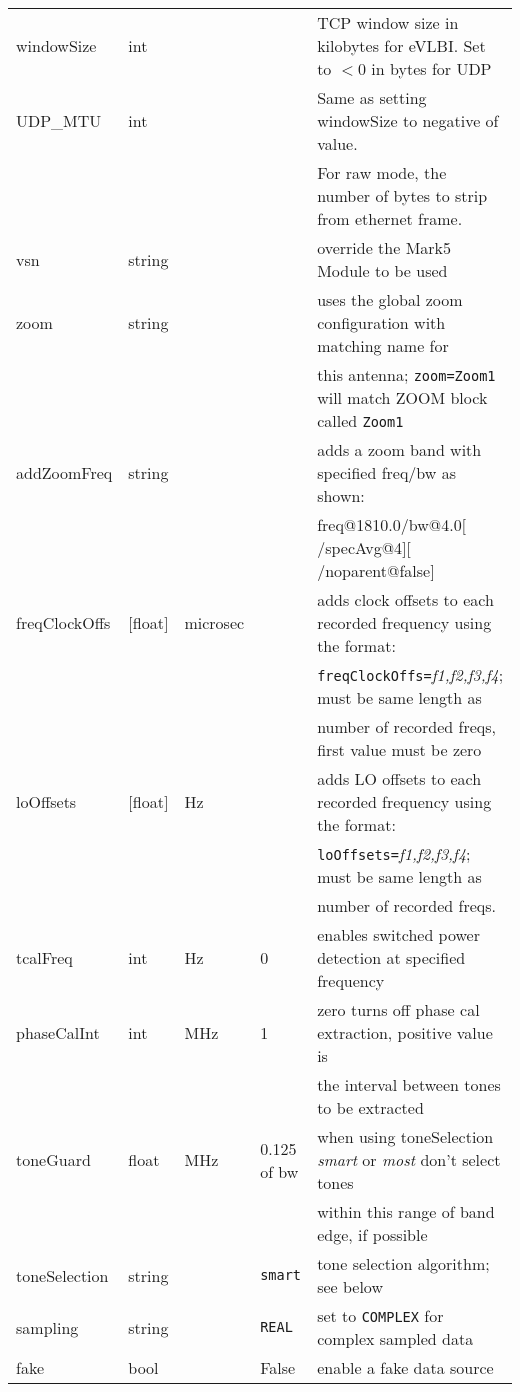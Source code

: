 \begin{center}
\begin{tabular}{l l l l l}
windowSize	& int		&		&		& TCP window size in kilobytes for eVLBI. Set to $<0$ in bytes for UDP \\
UDP\_MTU	& int		&		&		& Same as setting windowSize to negative of value. \\
		&		&		&		& For raw mode, the number of bytes to strip from ethernet frame. \\
vsn		& string	&		&		& override the Mark5 Module to be used \\
zoom 		& string	&		&		& uses the global zoom configuration with matching name for \\
		&		&		&		& this antenna; {\tt zoom=Zoom1} will match ZOOM block called {\tt Zoom1} \\
addZoomFreq	& string	&		&		& adds a zoom band with specified freq/bw as shown: \\
		&		&		&		& freq@1810.0/bw@4.0$[$/specAvg@4$][$/noparent@false$]$ \\
freqClockOffs	& $[$float$]$	& microsec	&		& adds clock offsets to each recorded frequency using the format: \\
		&		&		&		& {\tt freqClockOffs=}{\em f1,f2,f3,f4}; must be same length as \\
		&		&		&		& number of recorded freqs, first value must be zero \\
loOffsets 	& $[$float$]$	& Hz 		&		& adds LO offsets to each recorded frequency using the format: \\
		&		&		&		& {\tt loOffsets=}{\em f1,f2,f3,f4}; must be same length as \\
		&		&		&		& number of recorded freqs. \\
tcalFreq	& int		& Hz		& 0 		& enables switched power detection at specified frequency \\
phaseCalInt	& int		& MHz 		& 1		& zero turns off phase cal extraction, positive value is \\
		&		&		&		& the interval between tones to be extracted \\
toneGuard	& float		& MHz 		& 0.125 of bw	& when using toneSelection {\em smart} or {\em most} don't select tones \\
		&		&		&		& within this range of band edge, if possible \\
toneSelection & string  &		& {\tt smart}	& tone selection algorithm; see below \\
sampling	& string	&		& {\tt REAL}	& set to {\tt COMPLEX} for complex sampled data \\
fake		& bool		&		& False		& enable a fake data source \\
\hline
\hline
\end{tabular}
\end{center}

